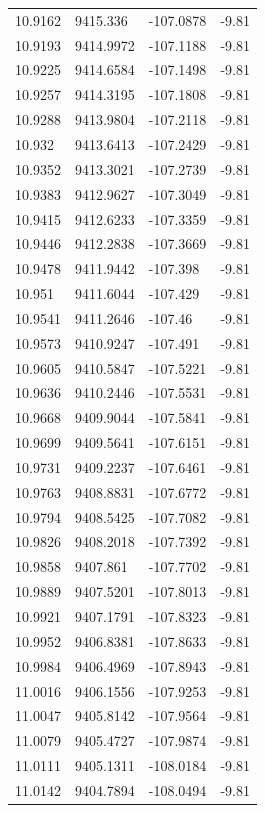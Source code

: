 \begin{table}[H]
\begin{tabular}{llll}
10.9162 & 9415.336 & -107.0878 & -9.81 \\
10.9193 & 9414.9972 & -107.1188 & -9.81 \\
10.9225 & 9414.6584 & -107.1498 & -9.81 \\
10.9257 & 9414.3195 & -107.1808 & -9.81 \\
10.9288 & 9413.9804 & -107.2118 & -9.81 \\
10.932 & 9413.6413 & -107.2429 & -9.81 \\
10.9352 & 9413.3021 & -107.2739 & -9.81 \\
10.9383 & 9412.9627 & -107.3049 & -9.81 \\
10.9415 & 9412.6233 & -107.3359 & -9.81 \\
10.9446 & 9412.2838 & -107.3669 & -9.81 \\
10.9478 & 9411.9442 & -107.398 & -9.81 \\
10.951 & 9411.6044 & -107.429 & -9.81 \\
10.9541 & 9411.2646 & -107.46 & -9.81 \\
10.9573 & 9410.9247 & -107.491 & -9.81 \\
10.9605 & 9410.5847 & -107.5221 & -9.81 \\
10.9636 & 9410.2446 & -107.5531 & -9.81 \\
10.9668 & 9409.9044 & -107.5841 & -9.81 \\
10.9699 & 9409.5641 & -107.6151 & -9.81 \\
10.9731 & 9409.2237 & -107.6461 & -9.81 \\
10.9763 & 9408.8831 & -107.6772 & -9.81 \\
10.9794 & 9408.5425 & -107.7082 & -9.81 \\
10.9826 & 9408.2018 & -107.7392 & -9.81 \\
10.9858 & 9407.861 & -107.7702 & -9.81 \\
10.9889 & 9407.5201 & -107.8013 & -9.81 \\
10.9921 & 9407.1791 & -107.8323 & -9.81 \\
10.9952 & 9406.8381 & -107.8633 & -9.81 \\
10.9984 & 9406.4969 & -107.8943 & -9.81 \\
11.0016 & 9406.1556 & -107.9253 & -9.81 \\
11.0047 & 9405.8142 & -107.9564 & -9.81 \\
11.0079 & 9405.4727 & -107.9874 & -9.81 \\
11.0111 & 9405.1311 & -108.0184 & -9.81 \\
11.0142 & 9404.7894 & -108.0494 & -9.81 \\

\end{tabular}
\end{table}
